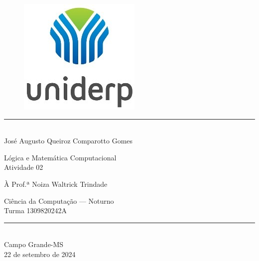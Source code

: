 \documentclass[12pt,letterpaper, onecolumn]{exam}
\author{\authorfullname}
\title{\subject: \assignment}
\newcommand{\subject}{Lógica e Matemática Computacional}
\newcommand{\assignment}{Atividade 02}
\newcommand{\authorfullname}{José Augusto Queiroz Comparotto Gomes}
\newcommand{\professor}{Prof.ª Noiza Waltrick Trindade}
\newcommand{\course}{Ciência da Computação — Noturno}
\newcommand{\classno}{1309820242A}
\newcommand{\location}{Campo Grande-MS}
\newcommand{\documentdate}{22 de setembro de 2024}
\begin{document}
\begingroup  

    \centering
    \begin{figure}
        \centering
        \includegraphics[width=0.15\linewidth]{assets/uniderp.jpg}
        \label{fig:university-logo}
    \end{figure}
    
    \rule{\textwidth}{2pt}  \\[1em]
    
    \LARGE \authorfullname

    \vfill
    
    \LARGE \subject     \\
    \LARGE \assignment
    
    \vfill
    
    \large À \professor \\

    \vfill
    
    \large \course          \\
    \large Turma \classno   \\[1em]
    
    \rule{\textwidth}{2pt}  \\[1em]

    \large \location        \\
    \large \documentdate    \\
    
    \pagebreak
\endgroup

\pointsdroppedatright   %
\printanswers
\renewcommand{\solutiontitle}{\noindent\textbf{Resposta:}\enspace}  
\end{document}

